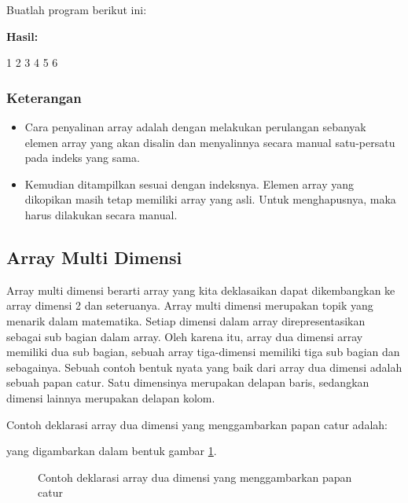 Buatlah program berikut ini:



\textbf{Hasil:}

\begin{lcverbatim}
1
2
3
4
5
6
\end{lcverbatim}

\subsubsection*{Keterangan}

\begin{itemize}

\item
 Cara penyalinan array adalah dengan melakukan perulangan sebanyak
 elemen array yang akan disalin dan menyalinnya secara manual
 satu-persatu pada indeks yang sama.
\item
 Kemudian ditampilkan sesuai dengan indeksnya. Elemen array yang
 dikopikan masih tetap memiliki array yang asli. Untuk menghapusnya,
 maka harus dilakukan secara manual.
\end{itemize}

\subsection{Array Multi Dimensi}\label{array-multi-dimensi}

Array multi dimensi berarti array yang kita deklasaikan dapat
dikembangkan ke array dimensi 2 dan seteruanya. Array multi dimensi
merupakan topik yang menarik dalam matematika. Setiap dimensi dalam
array direpresentasikan sebagai sub bagian dalam array. Oleh karena itu,
array dua dimensi array memiliki dua sub bagian, sebuah array
tiga-dimensi memiliki tiga sub bagian dan sebagainya. Sebuah contoh
bentuk nyata yang baik dari array dua dimensi adalah sebuah papan catur.
Satu dimensinya merupakan delapan baris, sedangkan dimensi lainnya
merupakan delapan kolom.

Contoh deklarasi array dua dimensi yang menggambarkan papan catur
adalah:



yang digambarkan dalam bentuk gambar \ref{fig:gambar3-2}.

\begin{figure}[htbp]
\centering
{}
\caption{Contoh deklarasi array dua dimensi yang menggambarkan papan catur}
\label{fig:gambar3-2}
\end{figure}

